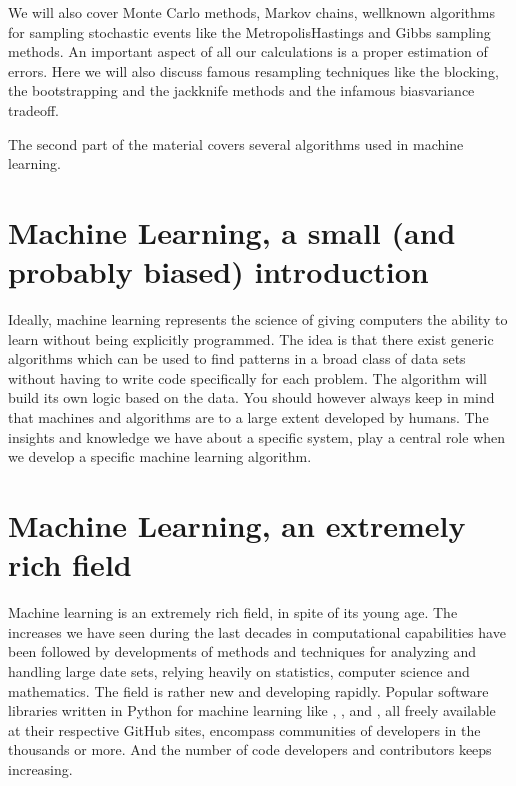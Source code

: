 \documentclass[letterpaper,10pt,english]{sphinxmanual}
\begin{document}
We will also cover Monte Carlo methods, Markov chains, well\sphinxhyphen{}known
algorithms for sampling stochastic events like the Metropolis\sphinxhyphen{}Hastings
and Gibbs sampling methods. An important aspect of all our
calculations is a proper estimation of errors. Here we will also
discuss famous resampling techniques like the blocking, the bootstrapping
and the jackknife methods and the infamous bias\sphinxhyphen{}variance tradeoff.

The second part of the material covers several algorithms used in
machine learning.


\chapter{Machine Learning, a small (and probably biased) introduction}
\label{\detokenize{chapter1:machine-learning-a-small-and-probably-biased-introduction}}
Ideally, machine learning represents the science of giving computers
the ability to learn without being explicitly programmed.  The idea is
that there exist generic algorithms which can be used to find patterns
in a broad class of data sets without having to write code
specifically for each problem. The algorithm will build its own logic
based on the data.  You should however always keep in mind that
machines and algorithms are to a large extent developed by humans. The
insights and knowledge we have about a specific system, play a central
role when we develop a specific machine learning algorithm.


\chapter{Machine Learning, an extremely rich field}
\label{\detokenize{chapter1:machine-learning-an-extremely-rich-field}}
Machine learning is an extremely rich field, in spite of its young
age. The increases we have seen during the last  decades in
computational capabilities have been followed by developments of
methods and techniques for analyzing and handling large date sets,
relying heavily on statistics, computer science and mathematics.  The
field is rather new and developing rapidly. Popular software libraries
written in Python for machine learning like
,
,
 and , all
freely available at their respective GitHub sites, encompass
communities of developers in the thousands or more. And the number of
code developers and contributors keeps increasing.
\end{document}
